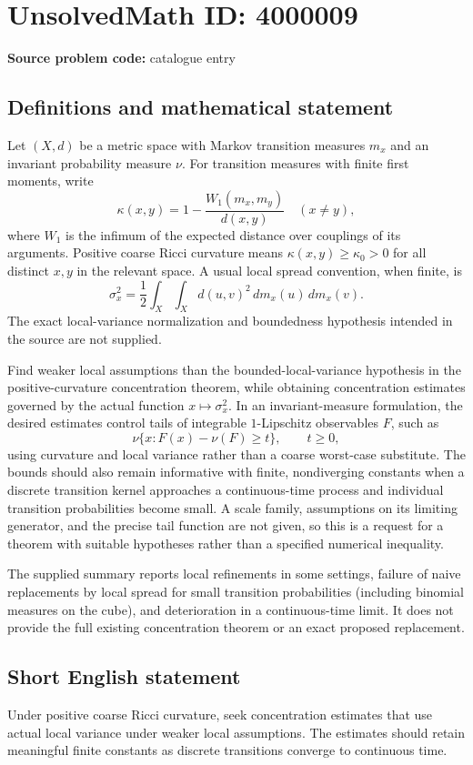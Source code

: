 \documentclass[11pt]{article}
\begin{document}
\section*{UnsolvedMath ID: 4000009}
\textbf{Source problem code:} catalogue entry
\subsection{Definitions and mathematical statement}
Let $(X,d)$ be a metric space with Markov transition measures $m_x$ and an invariant probability measure $\nu$. For transition measures with finite first moments, write
\[
\kappa(x,y)=1-\frac{W_1(m_x,m_y)}{d(x,y)}\quad(x\ne y),
\]
where $W_1$ is the infimum of the expected distance over couplings of its arguments. Positive coarse Ricci curvature means $\kappa(x,y)\geq\kappa_0>0$ for all distinct $x,y$ in the relevant space. A usual local spread convention, when finite, is
\[
\sigma_x^2=\frac12\int_X\int_X d(u,v)^2\,dm_x(u)\,dm_x(v).
\]
The exact local-variance normalization and boundedness hypothesis intended in the source are not supplied.

Find weaker local assumptions than the bounded-local-variance hypothesis in the positive-curvature concentration theorem, while obtaining concentration estimates governed by the actual function $x\mapsto\sigma_x^2$. In an invariant-measure formulation, the desired estimates control tails of integrable $1$-Lipschitz observables $F$, such as
\[
\nu\{x:F(x)-\nu(F)\geq t\},\qquad t\geq0,
\]
using curvature and local variance rather than a coarse worst-case substitute. The bounds should also remain informative with finite, nondiverging constants when a discrete transition kernel approaches a continuous-time process and individual transition probabilities become small. A scale family, assumptions on its limiting generator, and the precise tail function are not given, so this is a request for a theorem with suitable hypotheses rather than a specified numerical inequality.

The supplied summary reports local refinements in some settings, failure of naive replacements by local spread for small transition probabilities (including binomial measures on the cube), and deterioration in a continuous-time limit. It does not provide the full existing concentration theorem or an exact proposed replacement.
\subsection{Short English statement}
Under positive coarse Ricci curvature, seek concentration estimates that use actual local variance under weaker local assumptions. The estimates should retain meaningful finite constants as discrete transitions converge to continuous time.
\end{document}
